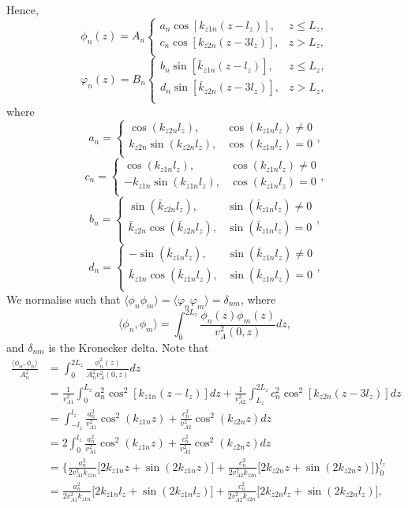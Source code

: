 \documentclass{article}
\begin{document}
Hence,
\[\phi_n(z)=A_n\begin{cases}
a_n\cos[k_{z1n} (z-l_z)], & z \le L_z, \\
c_n\cos[k_{z2n} (z-3l_z)], & z > L_z, \\
\end{cases}\]
\[\varphi_n(z)=B_n\begin{cases}
b_n\sin[\bar{k}_{z1n} (z-l_z)], & z \le L_z, \\
d_n\sin[\bar{k}_{z2n} (z-3l_z)], & z > L_z, \\
\end{cases}\]
where
\[a_n = \begin{cases}
\cos(k_{z2n} l_z), & \cos(k_{z1n} l_z) \ne 0 \\
k_{z2n}\sin(k_{z2n} l_z), & \cos(k_{z1n} l_z) = 0 \\
\end{cases},\]
\[c_n = \begin{cases}
\cos(k_{z1n} l_z), & \cos(k_{z1n} l_z) \ne 0 \\
-k_{z1n}\sin(k_{z1n} l_z), & \cos(k_{z1n} l_z) = 0 \\
\end{cases},\]
\[b_n = \begin{cases}
\sin(\bar{k}_{z2n} l_z), & \sin(\bar{k}_{z1n} l_z) \ne 0 \\
\bar{k}_{z2n}\cos(\bar{k}_{z2n} l_z), & \sin(\bar{k}_{z1n} l_z) = 0 \\
\end{cases},\]
\[d_n = \begin{cases}
-\sin(\bar{k}_{z1n} l_z), & \sin(\bar{k}_{z1n} l_z) \ne 0 \\
\bar{k}_{z1n}\cos(\bar{k}_{z1n} l_z), & \sin(\bar{k}_{z1n} l_z) = 0 \\
\end{cases},\]
We normalise such that $\langle \phi_n \phi_m\rangle = \langle \varphi_n \varphi_m\rangle = \delta_{nm}$, where 
\[\langle \phi_n, \phi_m \rangle = \int_0^{2L_z} \frac{\phi_n(z)\phi_m(z)}{v_A^2(0,z)}dz,\]
and $\delta_{nm}$ is the Kronecker delta. 
Note that
\[\begin{aligned}
\frac{\langle \phi_n, \phi_n \rangle}{A_n^2} &= \int_0^{2L_z} \frac{\phi_n^2(z)}{A_n^2v_A^2(0,z)}dz \\
&= \frac{1}{v_{A1}^2}\int_0^{L_z} a_n^2\cos^2[k_{z1n}(z-l_z)] dz + \frac{1}{v_{A2}^2}\int_{L_z}^{2L_z} c_n^2\cos^2[k_{z2n}(z-3l_z)]dz \\
&= \int_{-l_z}^{l_z} \frac{a_n^2}{v_{A1}^2}\cos^2(k_{z1n}z) + \frac{c_n^2}{v_{A2}^2}\cos^2(k_{z2n}z)dz \\
&= 2\int_{0}^{l_z} \frac{a_n^2}{v_{A1}^2}\cos^2(k_{z1n}z) + \frac{c_n^2}{v_{A2}^2}\cos^2(k_{z2n}z)dz \\
&=\Bigg\{\frac{a_n^2}{2v_{A1}^2k_{z1n}}\Big[2k_{z1n}z+\sin(2k_{z1n}z)\Big]+\frac{c_n^2}{2v_{A2}^2k_{z2n}}\Big[2k_{z2n}z+\sin(2k_{z2n}z)\Big]\Bigg\}_0^{l_z} \\
&=\frac{a_n^2}{2v_{A1}^2k_{z1n}}\Big[2k_{z1n}l_z+\sin(2k_{z1n}l_z)\Big]+\frac{c_n^2}{2v_{A2}^2k_{z2n}}\Big[2k_{z2n}l_z+\sin(2k_{z2n}l_z)\Big],
\end{aligned}\]
\end{document}
